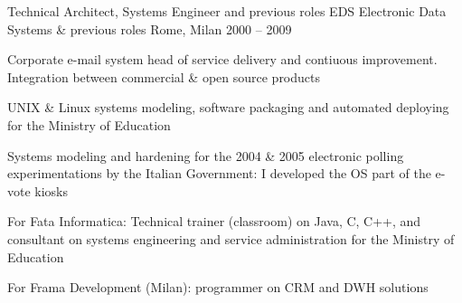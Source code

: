 \begin{cventries}
  \cventry
    {Technical Architect, Systems Engineer and previous roles} %
	{EDS Electronic Data Systems \& previous roles} %
    {Rome, Milan} %
    {2000 -- 2009} %
    {
      \begin{cvitems} %
				\item {Corporate e-mail system head of service delivery and contiuous improvement. Integration between commercial \& open source products}
				\item {UNIX \& Linux systems modeling, software packaging and automated deploying for the Ministry of Education}
				\item {Systems modeling and hardening for the 2004 \& 2005 electronic polling experimentations by the Italian Government: I developed the OS part of the e-vote kiosks}
				\item {For Fata Informatica: Technical trainer (classroom) on Java, C, C++, and consultant on systems engineering and service administration for the Ministry of Education}
				\item {For Frama Development (Milan): programmer on CRM and DWH solutions}
      \end{cvitems}
    }

\end{cventries}
